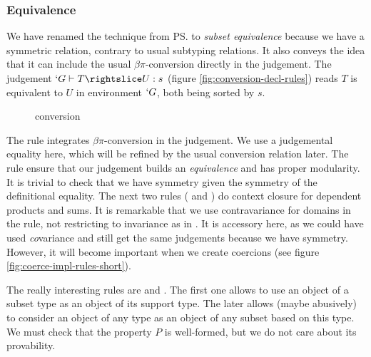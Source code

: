 \documentclass{llncs}
\begin{document}
\subsubsection{Equivalence}
We have renamed the technique from \ps{} to 
\emph{subset equivalence} because we have a symmetric relation, contrary
to usual subtyping relations. It also conveys the idea that it can
include the usual $\beta\pi$-conversion directly in the judgement.
The judgement $`G \typed T \subd{} U : s$ (figure
\vref{fig:conversion-decl-rules}) reads $T$ is equivalent to $U$ in
environment $`G$, both being sorted by $s$. 

\begin{figure}[h]
  \vspace{-1em}
  \subtdRules
  \vspace{-1em}
  \caption{\Russell{} conversion}
  \label{fig:conversion-decl-rules}
  \vspace{-1em}
\end{figure}

The rule  integrates $\beta\pi$-conversion in the
judgement. We use a judgemental equality here, which will be refined by
the usual conversion relation later. The  rule ensure
that our judgement builds an \emph{equivalence} and has
proper modularity. It is trivial to check that we have symmetry given 
the symmetry of the definitional equality. The next two rules ( and
) do context closure for dependent
products and sums. It is remarkable that we use contravariance for
domains in the  rule, not restricting to invariance as in
\PVS. It is accessory here, as we could have used \emph{co}variance and
still get the same judgements because we have symmetry. However, it will
become important when we create coercions (see figure
\vref{fig:coerce-impl-rules-short}).

The really interesting rules are  and
. The first one allows to use an object of a subset type
as an object of its support type. The later allows (maybe abusively) to
consider an object of any type as an object of any subset based on
this type. We must check that the property $P$ is well-formed, but
we do not care about its provability.
\end{document}
